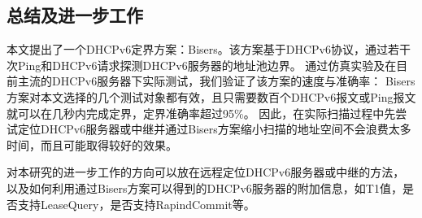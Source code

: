 \documentclass[UTF8]{article}
\begin{document}
\subsection{总结及进一步工作}

本文提出了一个DHCPv6定界方案：Bisers。该方案基于DHCPv6协议，通过若干次Ping和DHCPv6请求探测DHCPv6服务器的地址池边界。
通过仿真实验及在目前主流的DHCPv6服务器下实际测试，我们验证了该方案的速度与准确率：
Bisers方案对本文选择的几个测试对象都有效，且只需要数百个DHCPv6报文或Ping报文就可以在几秒内完成定界，定界准确率超过95\%。
因此，在实际扫描过程中先尝试定位DHCPv6服务器或中继并通过Bisers方案缩小扫描的地址空间不会浪费太多时间，而且可能取得较好的效果。

对本研究的进一步工作的方向可以放在远程定位DHCPv6服务器或中继的方法，
以及如何利用通过Bisers方案可以得到的DHCPv6服务器的附加信息，如T1值，是否支持LeaseQuery，是否支持RapindCommit等。


\end{document}
